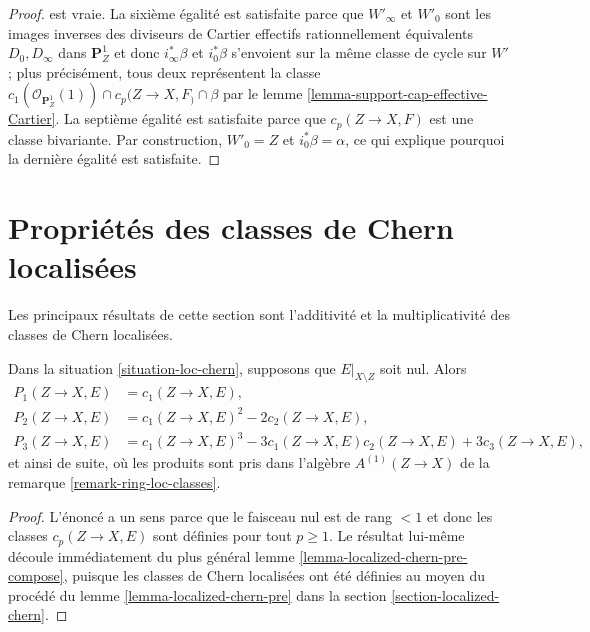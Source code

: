 \begin{proof}
est vraie. La sixième égalité est satisfaite parce que $W'_\infty$ et $W'_0$
sont les images inverses des diviseurs de Cartier effectifs rationnellement équivalents
$D_0, D_\infty$ dans $\mathbf{P}^1_Z$ et donc $i_\infty^*\beta$ et
$i_0^*\beta$ s'envoient sur la même classe de cycle sur $W'$; plus précisément, tous deux
représentent la classe
$c_1(\mathcal{O}_{\mathbf{P}^1_Z}(1)) \cap c_p(Z \to X, F_) \cap \beta$ par le
lemme \ref{lemma-support-cap-effective-Cartier}.
La septième égalité est satisfaite parce que $c_p(Z \to X, F)$ est
une classe bivariante. Par construction, $W'_0 = Z$ et $i_0^*\beta = \alpha$,
ce qui explique pourquoi la dernière égalité est satisfaite.
\end{proof}







\section{Propriétés des classes de Chern localisées}
\label{section-properties-loc-chern}

\noindent
Les principaux résultats de cette section sont l'additivité et la multiplicativité
des classes de Chern localisées.

\begin{lemma}
\label{lemma-loc-chern-character}
Dans la situation \ref{situation-loc-chern}, supposons que $E|_{X \setminus Z}$ soit nul.
Alors
\begin{align*}
P_1(Z \to X, E) & = c_1(Z \to X, E), \\
P_2(Z \to X, E) & = c_1(Z \to X, E)^2 - 2c_2(Z \to X, E), \\
P_3(Z \to X, E) & = c_1(Z \to X, E)^3 - 3c_1(Z \to X, E)c_2(Z \to X, E)
+ 3c_3(Z \to X, E),
\end{align*}
et ainsi de suite, où les produits sont pris dans l'algèbre $A^{(1)}(Z \to X)$
de la remarque \ref{remark-ring-loc-classes}.
\end{lemma}

\begin{proof}
L'énoncé a un sens parce que le faisceau nul est de rang $< 1$ et
donc les classes $c_p(Z \to X, E)$ sont définies pour tout $p \geq 1$.
Le résultat lui-même découle immédiatement du plus général
lemme \ref{lemma-localized-chern-pre-compose}, puisque les classes de Chern localisées
ont été définies au moyen du procédé du
lemme \ref{lemma-localized-chern-pre}
dans la section \ref{section-localized-chern}.
\end{proof}

